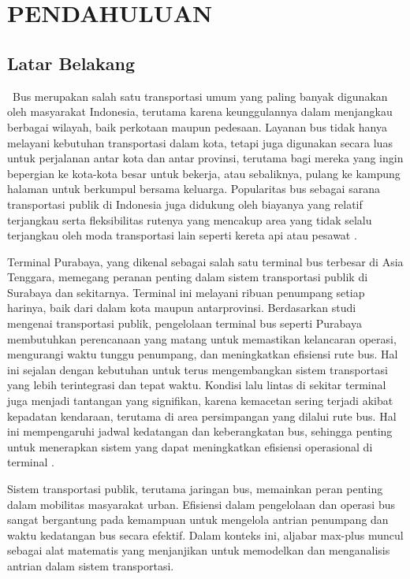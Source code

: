 \documentclass[12pt]{article}
\numberwithin{lemma}{subsection}
\begin{document}
\pagebreak
{}
\section{\\PENDAHULUAN}
\subsection{Latar Belakang}
$\,$\hskip 1cm Bus merupakan salah satu transportasi umum yang paling banyak digunakan oleh masyarakat Indonesia, terutama karena keunggulannya dalam menjangkau berbagai wilayah, baik perkotaan maupun pedesaan. Layanan bus tidak hanya melayani kebutuhan transportasi dalam kota, tetapi juga digunakan secara luas untuk perjalanan antar kota dan antar provinsi, terutama bagi mereka yang ingin bepergian ke kota-kota besar untuk bekerja, atau sebaliknya, pulang ke kampung halaman untuk berkumpul bersama keluarga. Popularitas bus sebagai sarana transportasi publik di Indonesia juga didukung oleh biayanya yang relatif terjangkau serta fleksibilitas rutenya yang mencakup area yang tidak selalu terjangkau oleh moda transportasi lain seperti kereta api atau pesawat \citep{Arum2015}.

Terminal Purabaya, yang dikenal sebagai salah satu terminal bus terbesar di Asia Tenggara, memegang peranan penting dalam sistem transportasi publik di Surabaya dan sekitarnya. Terminal ini melayani ribuan penumpang setiap harinya, baik dari dalam kota maupun antarprovinsi. Berdasarkan studi mengenai transportasi publik, pengelolaan terminal bus seperti Purabaya membutuhkan perencanaan yang matang untuk memastikan kelancaran operasi, mengurangi waktu tunggu penumpang, dan meningkatkan efisiensi rute bus. Hal ini sejalan dengan kebutuhan untuk terus mengembangkan sistem transportasi yang lebih terintegrasi dan tepat waktu. Kondisi lalu lintas di sekitar terminal juga menjadi tantangan yang signifikan, karena kemacetan sering terjadi akibat kepadatan kendaraan, terutama di area persimpangan yang dilalui rute bus. Hal ini mempengaruhi jadwal kedatangan dan keberangkatan bus, sehingga penting untuk menerapkan sistem yang dapat meningkatkan efisiensi operasional di terminal \citep{budi2018}.

Sistem transportasi publik, terutama jaringan bus, memainkan peran penting dalam mobilitas masyarakat urban. Efisiensi dalam pengelolaan dan operasi bus sangat bergantung pada kemampuan untuk mengelola antrian penumpang dan waktu kedatangan bus secara efektif. Dalam konteks ini, aljabar max-plus muncul sebagai alat matematis yang menjanjikan untuk memodelkan dan menganalisis antrian dalam sistem transportasi.
\end{document}
